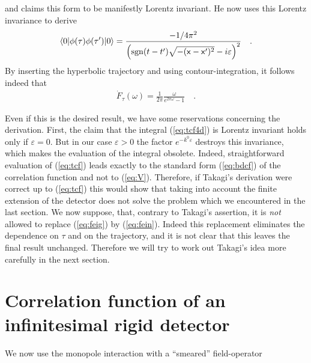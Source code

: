 \documentclass[a4paper,12pt]{article}
\newcommand{\bra}[1]{\langle #1|}
\newcommand{\ket}[1]{|#1\rangle }
\newcommand{\eps}{\varepsilon}
\newcommand{\Fd}{\dot F_{\tau}(\omega)}
\newcommand{\vvx}{\mathsf x}
\newcommand{\vac}{\ket{0}}
\newcommand{\cav}{\bra{0}}
\begin{document}
and claims this form to be manifestly Lorentz invariant.
He now uses this Lorentz invariance to derive
\begin{eqnarray}
\label{eq:V}
\cav\phi(\tau)\phi(\tau')\vac=\frac{-1/4\pi^2}{\left({\rm sgn}(t-t')
\sqrt{-(\vvx-\vvx')^2}-i\eps\right)^2}\quad.
\end{eqnarray}
By inserting the hyperbolic trajectory and using contour-integration, it follows
indeed that
\begin{eqnarray*}
\Fd=\frac{1}{2\pi}\frac{\omega}{e^{2\pi\omega}-1}\quad.
\end{eqnarray*}

Even if this is the desired result, we have some reservations concerning the derivation.
First, the claim that the integral (\ref{eq:tcf4d}) is Lorentz invariant holds only if
$\eps=0$. But in our case $\eps>0$ the factor $e^{-k^0\eps}$ destroys this invariance,
which makes the evaluation of the integral obsolete. Indeed, straightforward evaluation 
of (\ref{eq:tcf}) leads exactly to the standard form (\ref{eq:bdcf}) of the 
correlation function and not to (\ref{eq:V}). 
Therefore, if Takagi's derivation were correct up to (\ref{eq:tcf}) this would show that 
taking 
into account the finite extension of the detector does not solve the problem which we
encountered in the last section. We now suppose, that, contrary to Takagi's assertion,
it is {\em not} allowed to replace (\ref{eq:feig}) by (\ref{eq:fein}). 
Indeed this replacement eliminates
the dependence on $\tau$ and on the trajectory, and it is not clear that this leaves
the final result unchanged. Therefore we will try to work out Takagi's idea more 
carefully in the next section.




\section{Correlation function of an infinitesimal rigid detector}


We now use the monopole interaction with a ``smeared'' field-operator
\end{document}
